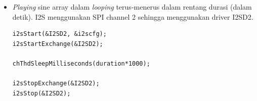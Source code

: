 \documentclass[12pt,]{article}
\begin{document}
\begin{itemize}
		\item \textit{Playing} sine array dalam \textit{looping}
		terus-menerus dalam rentang durasi (dalam detik).
		I2S menggunakan SPI channel 2 sehingga menggunakan driver I2SD2.
		\begin{verbatim}
i2sStart(&I2SD2, &i2scfg);
i2sStartExchange(&I2SD2);

chThdSleepMilliseconds(duration*1000);

i2sStopExchange(&I2SD2);
i2sStop(&I2SD2);
		\end{verbatim}
		
	\end{itemize}
\end{document}
